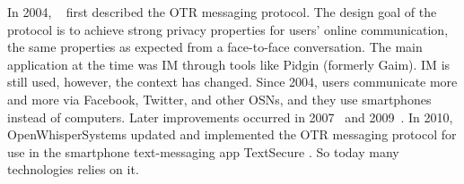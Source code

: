 
In 2004, \citeauthor{otr2004}~\cite{otr2004} first described the \ac{OTR} 
messaging protocol.
The design goal of the protocol is to achieve strong privacy properties for 
users' online communication, the same properties as expected from 
a face-to-face conversation.
The main application at the time was \ac{IM} through tools like Pidgin 
\cite{pidgin} (formerly Gaim).
\ac{IM} is still used, however, the context has changed.
Since 2004, users communicate more and more via Facebook, Twitter, and other 
\acp{OSN}, and they use smartphones instead of computers.
Later improvements occurred in 2007~\cite{otr2007} and 2009~\cite{multiotr2009}.
In 2010, OpenWhisperSystems updated and implemented the \ac{OTR} messaging 
protocol for use in the smartphone text-messaging app TextSecure 
\cite{textsecure}.
So today many technologies relies on it.


